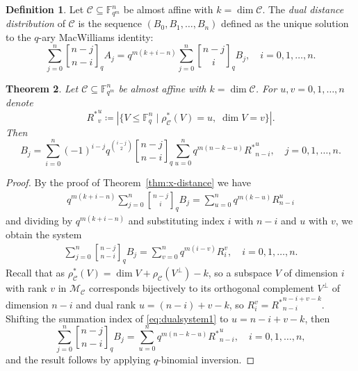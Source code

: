 \documentclass[a4paper,11pt,reqno]{article}
\newcommand{\F}{\mathbb{F}}
\newcommand{\M}{\mathcal{M}}
\newcommand{\C}{\mathcal{C}}
\newcommand{\qbinom}[2]{\genfrac[]{0pt}{0}{#1}{#2}}
\theoremstyle{plain} \numberwithin{equation}{section}
\newtheorem{theorem}{Theorem}[section]
\theoremstyle{definition}
\newtheorem{definition}[theorem]{Definition}
\begin{document}
\begin{definition}
    Let $\C\subseteq \F_{q^m}^n$ be almost affine with $k= \dim \C$. The \emph{dual distance distribution} of $\C$ is the sequence $(B_0,B_1,\ldots,B_n)$ defined as the unique solution to the $q$-ary MacWilliams identity:
    \[
        \sum^{n}_{j=0} \qbinom{n-j}{n-i}_q A_j = q^{m(k+i-n)}\sum^n_{j=0}  \qbinom{n-j}{i}_q B_j, \quad i=0,1,\ldots,n.\]
\end{definition}
\begin{theorem}
    Let $\C\subseteq \F_{q^m}^n$ be almost affine with $k=\dim \C$. For $u,v=0,1,\ldots,n$ denote
    \[
        {R^*}^u_v \coloneqq |\{ V\leq \F_q^n \mid \rho^*_\C(V)=u,\; \dim V = v\}|.
    \]
    Then
    \[
    B_j = \sum^{n}_{i=0}(-1)^{i-j}q^{\binom{i-j}{2}}\qbinom{n-j}{n-i}_q \sum^{n}_{u=0} q^{m(n-k-u)}{R^*}^{u}_{n-i}, \quad j =0,1,\ldots,n.
    \]
\end{theorem}
\begin{proof}
By the proof of Theorem~\ref{thm:x-distance} we have
\begin{align*}
    q^{m(k+i-n)}\sum^{n}_{j=0} \qbinom{n-j}{i}_q B_j = \sum^{n}_{u=0} q^{m(k-u)}{R}_{n-i}^u 
\end{align*}
and dividing by $q^{m(k+i-n)}$ and substituting index $i$ with $n-i$ and $u$ with $v$, we obtain the system
\begin{align}
    \sum^{n}_{j=0}\qbinom{n-j}{n-i}_qB_j = \sum^{n}_{v=0}q^{m(i-v)}{R}_i^v, \quad i =0,1,\ldots,n. \label{eq:dualsystem1}
\end{align}
Recall that as $\rho_\C^*(V)= \dim V + \rho_\C(V^\perp)-k$, so a subspace $V$ of dimension $i$ with rank $v$ in $\M_\C$ corresponds bijectively to its orthogonal complement $V^\perp$ of dimension $n-i$ and dual rank $u=(n-i)+v-k$, so ${R}_i^v = {R^*}_{n-i}^{n-i+v-k}$. Shifting the summation index of \eqref{eq:dualsystem1} to $u=n-i+v-k$, then
\[
    \sum^{n}_{j=0}\qbinom{n-j}{n-i}_qB_j = \sum^{n}_{u=0}q^{m(n-k-u)}{R^*}_{n-i}^u, \quad i =0,1,\ldots,n,
\]
and the result follows by applying $q$-binomial inversion.
\end{proof}
\end{document}
